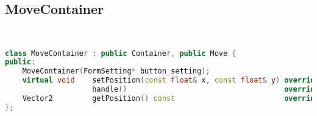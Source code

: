 \subsection{MoveContainer}
\begin{lstlisting}[language=C++]


class MoveContainer : public Container, public Move {
public:
    MoveContainer(FormSetting* button_setting);
    virtual void    setPosition(const float& x, const float& y) override,
                    handle()                                    override;
    Vector2         getPosition() const                         override;
};






\end{lstlisting}
